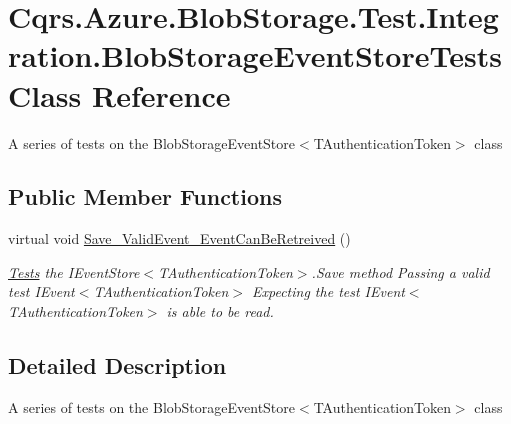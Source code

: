 \hypertarget{classCqrs_1_1Azure_1_1BlobStorage_1_1Test_1_1Integration_1_1BlobStorageEventStoreTests}{}\section{Cqrs.\+Azure.\+Blob\+Storage.\+Test.\+Integration.\+Blob\+Storage\+Event\+Store\+Tests Class Reference}
\label{classCqrs_1_1Azure_1_1BlobStorage_1_1Test_1_1Integration_1_1BlobStorageEventStoreTests}


A series of tests on the Blob\+Storage\+Event\+Store$<$\+T\+Authentication\+Token$>$ class  


\subsection*{Public Member Functions}
\begin{DoxyCompactItemize}
\item 
virtual void \hyperlink{classCqrs_1_1Azure_1_1BlobStorage_1_1Test_1_1Integration_1_1BlobStorageEventStoreTests_ac74c18e7aeeaedb7e0328b1ab8b2a8e8_ac74c18e7aeeaedb7e0328b1ab8b2a8e8}{Save\+\_\+\+Valid\+Event\+\_\+\+Event\+Can\+Be\+Retreived} ()
\begin{DoxyCompactList}\small\item\em \hyperlink{namespaceCqrs_1_1Tests}{Tests} the I\+Event\+Store$<$\+T\+Authentication\+Token$>$.\+Save method Passing a valid test I\+Event$<$\+T\+Authentication\+Token$>$ Expecting the test I\+Event$<$\+T\+Authentication\+Token$>$ is able to be read. \end{DoxyCompactList}\end{DoxyCompactItemize}


\subsection{Detailed Description}
A series of tests on the Blob\+Storage\+Event\+Store$<$\+T\+Authentication\+Token$>$ class 



